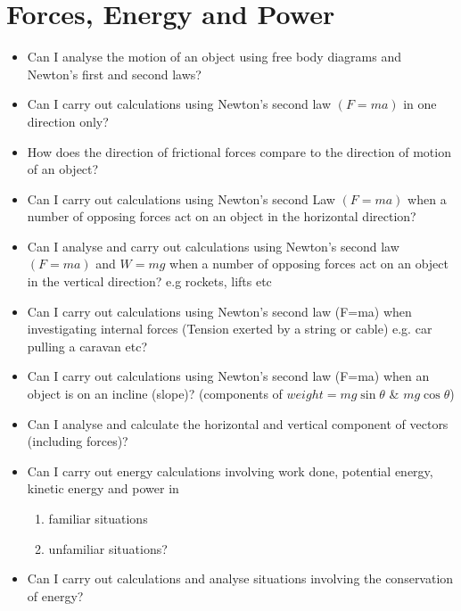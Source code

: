     \section{Forces, Energy and Power}
    \begin{multicols}{2}
        \begin{itemize}

        \item Can I analyse the motion of an object using free body
            diagrams and Newton’s first and second laws?

        \item Can I carry out calculations using Newton’s second law
            $(F=ma)$ in one direction only?

        \item How does the direction of frictional forces compare to the
            direction of motion of an object?

        \item Can I carry out calculations using Newton’s second Law
            $(F=ma)$ when a number of opposing forces act on an object
            in the horizontal direction?
            
        \item Can I analyse and carry out calculations using Newton’s
            second law $(F=ma)$ and $W=mg$ when a number of opposing
            forces act on an object in the vertical direction? e.g rockets,
            lifts etc

        \item Can I carry out calculations using Newton’s second law
            (F=ma) when investigating internal forces (Tension exerted
            by a string or cable) e.g. car pulling a caravan etc?

        \item Can I carry out calculations using Newton’s second law
            (F=ma) when an object is on an incline (slope)?
            (components of $weight = mg\sin\theta$ \& $mg\cos\theta$)

        \item Can I analyse and calculate the horizontal and vertical
            component of vectors (including forces)?

        \item Can I carry out energy calculations involving work
            done, potential energy, kinetic energy and power in
            \begin{enumerate}
                \item familiar situations
                \item unfamiliar situations?
            \end{enumerate}

        \item Can I carry out calculations and analyse situations
            involving the conservation of energy?

        \end{itemize}
    \end{multicols}

